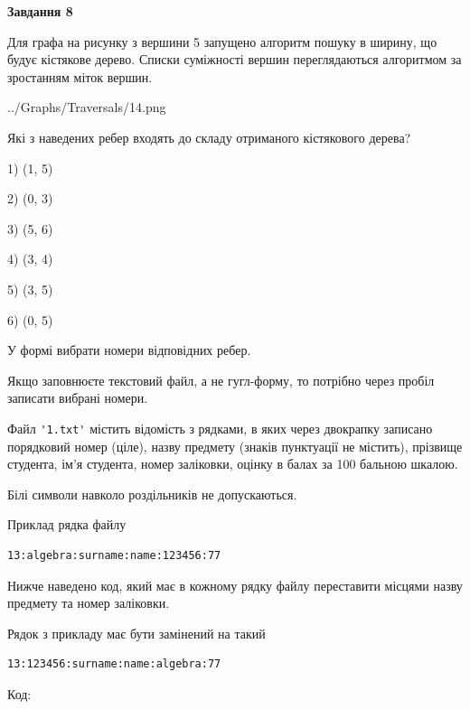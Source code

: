 \documentclass[12pt, ukrainian]{article}
\def\code#1{\Verb!#1!}
\begin{document}
{\begin {large}
{\begin {center}\textbf{Завдання 8}\end {center}}\par
Для графа на рисунку з вершини 5 запущено алгоритм пошуку в ширину, що будує кістякове дерево. Списки суміжності вершин переглядаються алгоритмом за зростанням міток вершин.\par
\begin{center}
	{../Graphs/Traversals/14.png}
\end{center}
\par Які з наведених ребер входять до складу отриманого кістякового дерева?\par
1) (1, 5)\par
2) (0, 3)\par
3) (5, 6)\par
4) (3, 4)\par
5) (3, 5)\par
6) (0, 5)\par
{\vskip 15pt} У формі вибрати номери відповідних ребер.


Якщо заповнюєте текстовий файл, а не гугл-форму, то потрібно через пробіл записа\-ти вибрані номери.\par
\newpage


Файл \code{'1.txt'} містить відомість з рядками, в яких через двокрапку записано поряд\-ковий номер (ціле), назву предмету (знаків пунктуації не містить), прізвище студента, ім'я студента, номер заліковки, оцінку в балах за 100 бальною шкалою.

Білі символи навколо роздільників не допускаються.

Приклад рядка файлу



\begin{verbatim}
13:algebra:surname:name:123456:77
\end{verbatim}


Нижче наведено код, який має в кожному рядку файлу переставити місцями назву предмету та номер заліковки.

Рядок з прикладу має бути замінений на такий



\begin{verbatim}
13:123456:surname:name:algebra:77
\end{verbatim}




Код:




\end{large}}
\end{document}
